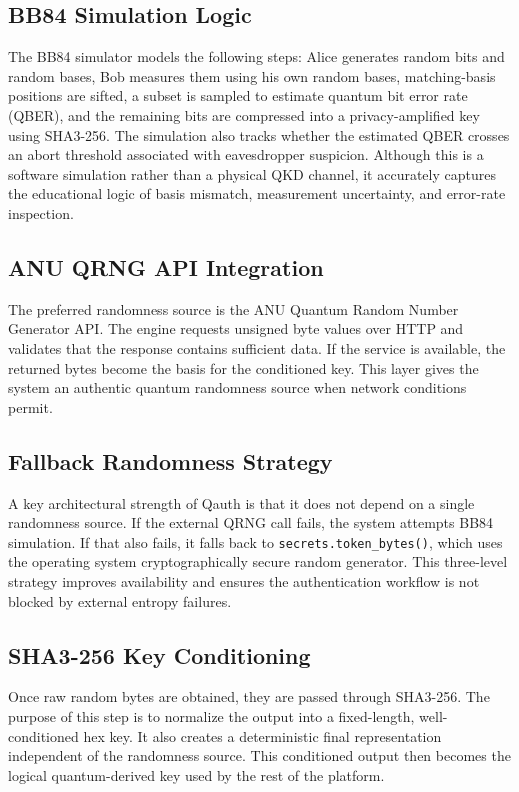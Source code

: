 \subsection{BB84 Simulation Logic}
The BB84 simulator models the following steps: Alice generates random bits and random bases, Bob measures them using his own random bases, matching-basis positions are sifted, a subset is sampled to estimate quantum bit error rate (QBER), and the remaining bits are compressed into a privacy-amplified key using SHA3-256. The simulation also tracks whether the estimated QBER crosses an abort threshold associated with eavesdropper suspicion. Although this is a software simulation rather than a physical QKD channel, it accurately captures the educational logic of basis mismatch, measurement uncertainty, and error-rate inspection.

\subsection{ANU QRNG API Integration}
The preferred randomness source is the ANU Quantum Random Number Generator API. The engine requests unsigned byte values over HTTP and validates that the response contains sufficient data. If the service is available, the returned bytes become the basis for the conditioned key. This layer gives the system an authentic quantum randomness source when network conditions permit.

\subsection{Fallback Randomness Strategy}
A key architectural strength of Qauth is that it does not depend on a single randomness source. If the external QRNG call fails, the system attempts BB84 simulation. If that also fails, it falls back to \texttt{secrets.token\_bytes()}, which uses the operating system cryptographically secure random generator. This three-level strategy improves availability and ensures the authentication workflow is not blocked by external entropy failures.

\subsection{SHA3-256 Key Conditioning}
Once raw random bytes are obtained, they are passed through SHA3-256. The purpose of this step is to normalize the output into a fixed-length, well-conditioned hex key. It also creates a deterministic final representation independent of the randomness source. This conditioned output then becomes the logical quantum-derived key used by the rest of the platform.


